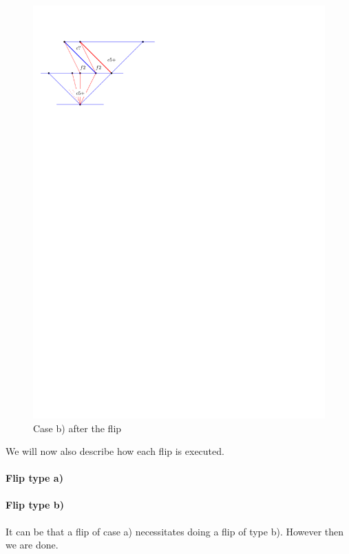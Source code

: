 \begin{figure}[h]
  \centering
  \includegraphics[scale=1]{unifiedAlgo/img/flipactionb}
  \caption{Case b) after the flip}
  \label{fig:uni:flipactionb}
\end{figure}

We will now also describe how each flip is executed.

\paragraph{Flip type a)}

\paragraph{Flip type b)}


It can be that a flip of case a) necessitates doing a flip of type b). However then we are done.


